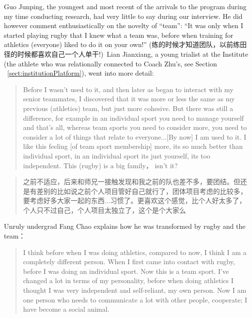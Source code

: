 \begin{CJK}{UTF8}{gbsn}
Guo Junping, the youngest and most recent of the arrivals to the program during my time conducting research, had very little to say during our interview. He did however comment enthusiastically on the novelty of ``team'': ``It was only when I started playing rugby that I knew what a team was, before when training for athletics (everyone) liked to do it on your own!'' (练的时候才知道团队，以前练田径的时候都喜欢自己一个人单干!) Lian Jianxiang, a young trialist at the Institute (the athlete who was relationally connected to Coach Zhu's, see Section ~\ref{sect:institutionPlatform}), went into more detail:

    \begin{quotation}
     Before I wasn’t used to it, and then later as began to interact with my senior teammates, I discovered that it was more or less the same as my previous (athletics) team, but just more cohesive.  But there was still a difference, for example in an individual sport you need to manage yourself and that's all, whereas team sports you need to consider more, you need to consider a lot of things that relate to everyone...[By now] I am used to it. I like this feeling [of team sport membership] more, its so much better than individual sport, in an individual sport its just yourself, its too independent. This (rugby) is a big family， isn’t it?
    \end{quotation}

    \begin{quotation}
      之前不适应，后来和师兄一接触发现和我之前的队也差不多，要团结。但还是有差别的比如说之前个人项目管好自己就行了，团体项目考虑的比较多，要考虑好多大家一起的东西...习惯了。更喜欢这个感觉，比个人好太多了，个人只不过自己，个人项目太独立了，这个是个大家么 \\
    \end{quotation}

  Unruly undergrad Fang Chao explains how he was transformed by rugby and the team：

      \begin{quotation}
        I think before when I was doing athletics, compared to now, I think I am a completely different person.  When I first came into contact with rugby, before I was doing an individual sport.  Now this is a team sport. I've changed a lot in terms of my personality, before when doing athletics I thought I was very independent and self-reliant, my own person.  Now I am one person who needs to communicate a lot with other people, cooperate; I have become a social animal.
      \end{quotation}


\end{CJK}
